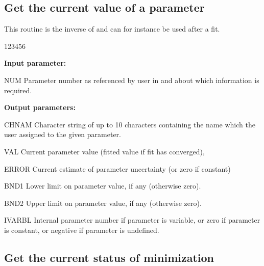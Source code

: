 \subsection{Get the current value of a parameter}

This routine is the inverse of  and
can for instance be used after a fit.

 
\begin{DLtt}{123456}
\item[{\rm\bf Input parameter:}]
\item[NUM]    Parameter number as referenced by user in  and
              about which information is required.
\item[{\rm\bf Output parameters:}]
\item[CHNAM]  Character string of up to 10 characters containing
              the name which the user assigned to the given parameter.
\item[VAL]    Current parameter value (fitted value if fit has converged),
\item[ERROR]  Current estimate of parameter uncertainty (or zero if constant)
\item[BND1]   Lower limit on parameter value, if any (otherwise zero).
\item[BND2]   Upper limit on parameter value, if any (otherwise zero).
\item[IVARBL] Internal parameter number if parameter is variable, or
              zero if parameter is constant, or negative if parameter is undefined.
\end{DLtt}
 
\subsection{Get the current status of minimization}

 
